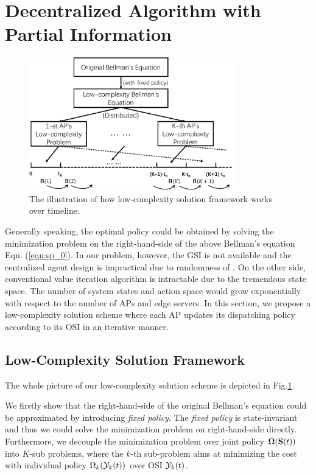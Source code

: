 \section{Decentralized Algorithm with Partial Information}
\begin{figure}[t]
    \centering
    \includegraphics[width=0.80\textwidth]{images/solution-framework.pdf}
    \caption{The illustration of how low-complexity solution framework works over timeline.}
    \label{fig:solution}
\end{figure}

Generally speaking, the optimal policy could be obtained by solving the minimization problem on the right-hand-side of the above Bellman's equation Eqn. (\ref{eqn:sp_0}).
In our problem, however, the GSI is not available and the centralized agent design is impractical due to randomness of \brlatency.
On the other side, conventional value iteration algorithm is intractable due to the tremendous state space.
The number of system states and action space would grow exponentially with respect to the number of APs and edge servers.
In this section, we propose a low-complexity solution scheme where each AP updates its dispatching policy according to its OSI in an iterative manner.

\subsection{Low-Complexity Solution Framework}
The whole picture of our low-complexity solution scheme is depicted in Fig.\ref{fig:solution}.

We firstly show that the right-hand-side of the original Bellman's equation could be approximated by introducing \emph{fixed policy}.
The \emph{fixed policy} is state-invariant and thus we could solve the minimization problem on right-hand-side directly.
Furthermore, we decouple the minimization problem over joint policy $\boldsymbol{\Omega}(\mathbf{S}(t))$ into $K$-sub problems, where the $k$-th sub-problem aims at minimizing the cost with individual policy $\Omega_{k}(\mathcal{Y}_{k}(t))$ over OSI $\mathcal{Y}_{k}(t)$.

